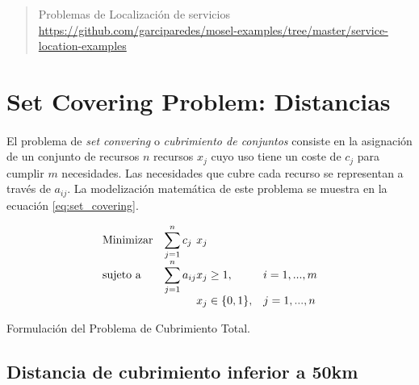 \documentclass[spanish]{article}
\begin{document}
	\maketitle %

	\thispagestyle{fancy} %



	\begin{abstract}
		\noindent Problemas de Localización de servicios \url{https://github.com/garciparedes/mosel-examples/tree/master/service-location-examples}\cite{garciparedes:mosel-examples}
	\end{abstract}



  \section{Set Covering Problem: Distancias}
	\label{sec:1}

    \paragraph{}
		El problema de \emph{set convering} o \emph{cubrimiento de conjuntos} consiste en la asignación de un conjunto de recursos $n$ recursos $x_{j}$ cuyo uso tiene un coste de $c_{j}$ para cumplir $m$ necesidades. Las necesidades que cubre cada recurso se representan a través de $a_{ij}$. La modelización matemática de este problema se muestra en la ecuación \eqref{eq:set_covering}.


		\begin{eqfloat}
			\begin{equation}
				\begin{array}{ll@{}ll}
					\text{Minimizar}	& \displaystyle\sum\limits_{j=1}^{n} c_{j}	&	x_{j} &\\
					\text{sujeto a}		& \displaystyle\sum\limits_{j = 1}^n a_{ij}	&	x_{j} \geq 1,  &i=1 ,..., m\\
													 	&                                           &	x_{j} \in \{0,1\}, &j=1 ,..., n
				\end{array}
			\end{equation}
      \caption{Formulación del Problema de Cubrimiento Total.}
      \label{eq:set_covering}
    \end{eqfloat}

		\subsection{Distancia de cubrimiento inferior a 50km}
		\label{sec:1.1}
\end{document}
